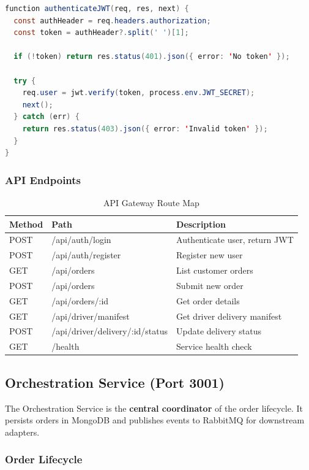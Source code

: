 \documentclass[12pt,a4paper]{article}
\begin{document}
\begin{lstlisting}[language=java, caption={JWT Authentication Middleware}]
function authenticateJWT(req, res, next) {
  const authHeader = req.headers.authorization;
  const token = authHeader?.split(' ')[1];
  
  if (!token) return res.status(401).json({ error: 'No token' });
  
  try {
    req.user = jwt.verify(token, process.env.JWT_SECRET);
    next();
  } catch (err) {
    return res.status(403).json({ error: 'Invalid token' });
  }
}
\end{lstlisting}

\subsubsection{API Endpoints}

\begin{table}[H]
\centering
\caption{API Gateway Route Map}
\begin{tabularx}{\textwidth}{llX}
\toprule
\textbf{Method} & \textbf{Path} & \textbf{Description} \\
\midrule
POST & /api/auth/login & Authenticate user, return JWT \\
POST & /api/auth/register & Register new user \\
GET & /api/orders & List customer orders \\
POST & /api/orders & Submit new order \\
GET & /api/orders/:id & Get order details \\
GET & /api/driver/manifest & Get driver delivery manifest \\
POST & /api/driver/delivery/:id/status & Update delivery status \\
GET & /health & Service health check \\
\bottomrule
\end{tabularx}
\end{table}

\subsection{Orchestration Service (Port 3001)}

The Orchestration Service is the \textbf{central coordinator} of the order lifecycle. It persists orders in MongoDB and publishes events to RabbitMQ for downstream adapters.

\subsubsection{Order Lifecycle}
\end{document}
